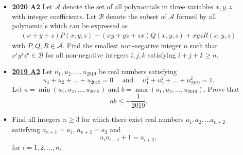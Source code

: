 \documentclass[11pt]{scrartcl}
\begin{document}
\begin{itemize}[leftmargin=*]
Determine all integers $n \geqslant  1$ for which the sum of the $n^2$ entries in the table is equal to $\frac{1}{4}n^2(n-1)$.
\item \href{https://artofproblemsolving.com/community/c6h2625905p22698387}{\textbf{2020 A2}} Let $\mathcal{A}$ denote the set of all polynomials in three variables $x, y, z$ with integer coefficients. Let $\mathcal{B}$ denote the subset of $\mathcal{A}$ formed by all polynomials which can be expressed as
\begin{align*}
(x + y + z)P(x, y, z) + (xy + yz + zx)Q(x, y, z) + xyzR(x, y, z)
\end{align*}with $P, Q, R \in \mathcal{A}$. Find the smallest non-negative integer $n$ such that $x^i y^j z^k \in \mathcal{B}$ for all non-negative integers $i, j, k$ satisfying $i + j + k \geqslant  n$.
\item \href{https://artofproblemsolving.com/community/c6h2279014p17828913}{\textbf{2019 A2}} Let $u_1, u_2, \dots, u_{2019}$ be real numbers satisfying\[u_{1}+u_{2}+\dots+u_{2019}=0 \quad \text { and } \quad u_{1}^{2}+u_{2}^{2}+\dots+u_{2019}^{2}=1.\]Let $a=\min \left(u_{1}, u_{2}, \dots, u_{2019}\right)$ and $b=\max \left(u_{1}, u_{2}, \dots, u_{2019}\right)$. Prove that
\[
a b \leqslant-\frac{1}{2019}.
\]
\item {} Find all integers $n \geqslant  3$ for which there exist real numbers $a_1, a_2, \dots a_{n + 2}$ satisfying $a_{n + 1} = a_1$, $a_{n + 2} = a_2$ and
$$a_ia_{i + 1} + 1 = a_{i + 2},$$for $i = 1, 2, \dots, n$.


\end{itemize}
\end{document}
